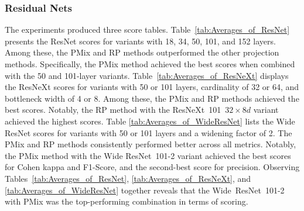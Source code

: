 \documentclass[final,3p,times,twocolumn]{elsarticle}
\begin{document}
\subsubsection{Residual Nets}

The experiments produced three score tables.
Table~\ref{tab:Averages_of_ResNet} presents the ResNet scores for variants with 18, 34, 50, 101, and 152 layers. Among these, the \gls{PMix} and \gls{RP} methods outperformed the other projection methods. Specifically, the \gls{PMix} method achieved the best scores when combined with the 50 and 101-layer variants.
Table~\ref{tab:Averages_of_ResNeXt} displays the ResNeXt scores for variants with 50 or 101 layers, cardinality of 32 or 64, and bottleneck width of 4 or 8. Among these, the \gls{PMix} and \gls{RP} methods achieved the best scores. Notably, the \gls{RP} method with the \mbox{ResNeXt 101 $32\times 8d$} variant achieved the highest scores.
Table \ref{tab:Averages_of_WideResNet} lists the Wide ResNet scores for variants with 50 or 101 layers and a widening factor of 2. The \gls{PMix} and \gls{RP} methods consistently performed better across all metrics. Notably, the \gls{PMix} method with the Wide \mbox{ResNet 101-2} variant achieved the best scores for Cohen kappa and F1-Score, and the second-best score for precision.
Observing Tables~\ref{tab:Averages_of_ResNet}, \ref{tab:Averages_of_ResNeXt}, and \ref{tab:Averages_of_WideResNet} together reveals that the \mbox{Wide ResNet 101-2} with \gls{PMix} was the top-performing combination in terms of scoring.
\end{document}
